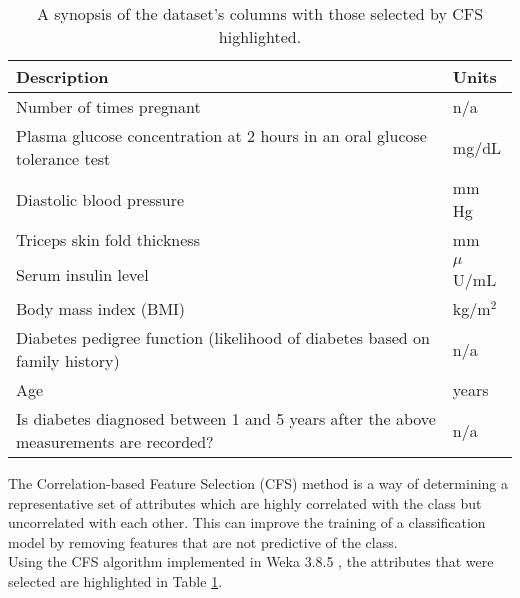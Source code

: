 \begin{table}[h!]
    \caption{A synopsis of the dataset's columns with those selected by CFS highlighted.\label{tab:cols}}
    \begin{center}
        \begin{tabular}{|m{14cm}|l|}
        \hline
        \textbf{Description} & \textbf{Units} \\
        \hline
        Number of times pregnant & n/a\nomenclature{n/a}{Not applicable} \\
        \rowcolor{yellow}Plasma glucose concentration at 2 hours in an oral glucose tolerance test & mg/dL\nomenclature{mg/dL}{Milligrams per decilitre} \\
        Diastolic blood pressure & mm Hg\nomenclature{mm Hg}{Millimetres of mercury} \\
        Triceps skin fold thickness & mm\nomenclature{mm}{Millimetres} \\
        \rowcolor{yellow}Serum insulin level & $\mu$U/mL\nomenclature{$\mu$U/mL}{Micro enzyme units per millilitre} \\
        \rowcolor{yellow}Body mass index (BMI) & kg/m$^2$\nomenclature{kg/m$^2$}{Weight in kilograms per height in metres squared} \\
        \rowcolor{yellow}Diabetes pedigree function (likelihood of diabetes based on family history) & n/a \\
        \rowcolor{yellow}Age & years \\
        Is diabetes diagnosed between 1 and 5 years after the above measurements are recorded? & n/a\\
        \hline
    \end{tabular}
    \end{center}
    The Correlation-based Feature Selection (CFS) method is a way of determining a representative set of attributes which are highly correlated with the class but uncorrelated with each other. This can improve the training of a classification model by removing features that are not predictive of the class. \\

    Using the CFS algorithm implemented in Weka 3.8.5 \cite{weka}, the attributes that were selected are highlighted in Table \ref{tab:cols}.
\end{table}
